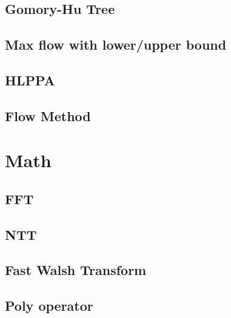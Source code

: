 \documentclass[a4paper,10pt,twocolumn,oneside]{article}
\begin{document}
\subsection{Gomory-Hu Tree}


\subsection{Max flow with lower/upper bound}


%

\subsection{HLPPA}


\subsection{Flow Method}


\section{Math}
\subsection{FFT}


\subsection{NTT}


\subsection{Fast Walsh Transform}


\subsection{Poly operator}


%
\end{document}
